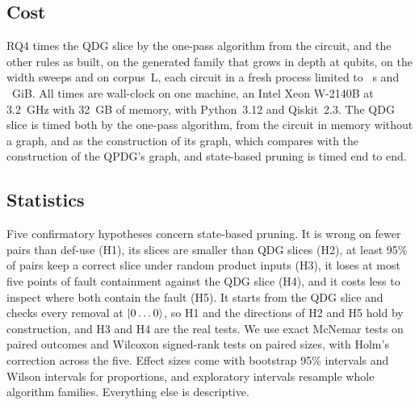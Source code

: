 \subsection{Cost}
RQ4 times the QDG slice by the one-pass algorithm from the circuit, and the other rules as built, on the generated family that grows in depth at \numCostDepthWidth{} qubits, on the width sweeps and on
corpus~L, each circuit in a fresh process limited to \numCostWallLimit{}~s and \numCostMemLimit{}~GiB. All times are wall-clock
on one machine, an Intel Xeon W-2140B at 3.2~GHz with 32~GB of memory, with Python~3.12 and Qiskit~2.3. The QDG slice is timed both by the one-pass algorithm, from the circuit in memory without a graph, and as the
construction of its graph, which compares with the construction of the QPDG's graph, and state-based pruning is timed
end to end.

\subsection{Statistics}\label{sec:stats}
Five confirmatory hypotheses concern state-based pruning. It is wrong on fewer pairs than def-use (H1), its slices
are smaller than QDG slices (H2), at least 95\% of pairs keep a correct slice under random product inputs (H3), it
loses at most five points of fault containment against the QDG slice (H4), and it costs less to inspect where both
contain the fault (H5). It starts from the QDG slice and checks every removal at $\lvert 0\dots0\rangle$, so H1 and the
directions of H2 and H5 hold by construction, and H3 and H4 are the real tests. We use exact McNemar tests on paired outcomes and Wilcoxon signed-rank tests on paired
sizes, with Holm's correction across the five. Effect sizes come with bootstrap 95\% intervals and Wilson intervals
for proportions, and exploratory intervals resample whole algorithm families. Everything else is descriptive.
